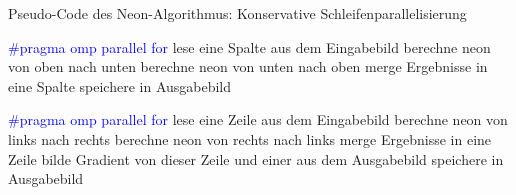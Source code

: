 \begin{algorithm}[H]
\caption{Pseudo-Code des \glqq Neon\grqq-Algorithmus: Konservative Schleifenparallelisierung}
\label{algo:neon_conservative}
\begin{algorithmic}[1]
\State \textcolor{blue}{\#pragma omp parallel for }
	\State lese eine Spalte aus dem Eingabebild
		\State berechne neon von oben nach unten
	\EndFor
		\State berechne neon von unten nach oben
	\EndFor
	\State merge Ergebnisse in eine Spalte
	\State speichere in Ausgabebild
\EndFor	


\State \textcolor{blue}{\#pragma omp parallel for }
	\State lese eine Zeile aus dem Eingabebild
		\State berechne neon von links nach rechts
	\EndFor
		\State berechne neon von rechts nach links
	\EndFor	
		\State merge Ergebnisse in eine Zeile
	\State bilde Gradient von dieser Zeile und einer aus dem Ausgabebild
	\State speichere in Ausgabebild
\EndFor
\end{algorithmic}
\end{algorithm}






















